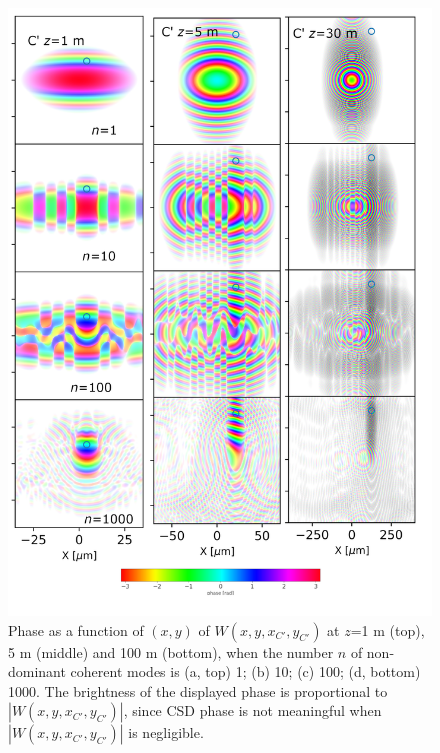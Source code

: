 \documentclass{iucr}              %
\begin{document}
\begin{figure}\label{pointC_propagated}%
\caption{Phase as a function of $(x,y)$ of $W(x,y,x_{C'},y_{C'})$ at $z$=1 m (top), 5 m (middle) and 100 m (bottom), when the number $n$ of non-dominant coherent modes is (a, top) 1; (b) 10; (c) 100; (d, bottom) 1000. The brightness of the displayed phase is proportional to $|W(x,y,x_{C'},y_{C'})|$, since CSD phase is not meaningful when $|W(x,y,x_{C'},y_{C'})|$ is negligible.}
\includegraphics[width=1.0\textwidth]{Figures/vx_id16a_C1-5-30_propagated.png}

\end{figure}
\end{document}
